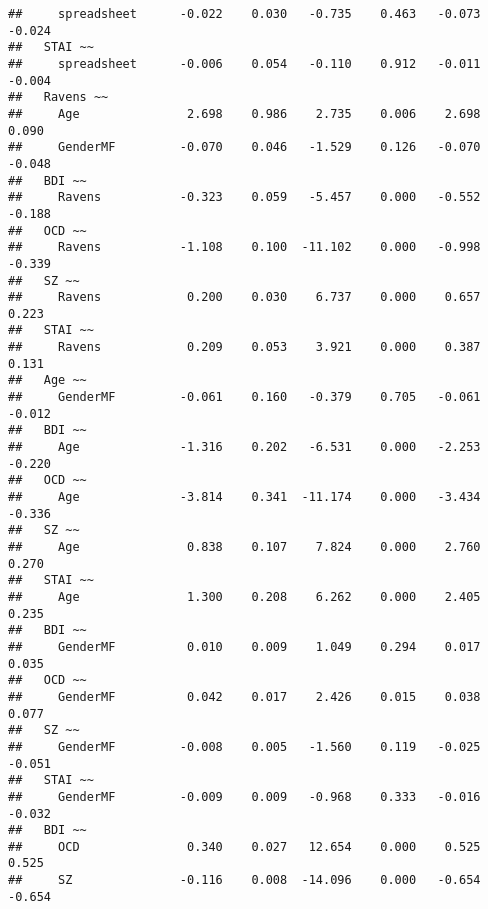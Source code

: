 \documentclass[]{article}
\begin{document}
\begin{verbatim}
##     spreadsheet      -0.022    0.030   -0.735    0.463   -0.073   -0.024
##   STAI ~~                                                               
##     spreadsheet      -0.006    0.054   -0.110    0.912   -0.011   -0.004
##   Ravens ~~                                                             
##     Age               2.698    0.986    2.735    0.006    2.698    0.090
##     GenderMF         -0.070    0.046   -1.529    0.126   -0.070   -0.048
##   BDI ~~                                                                
##     Ravens           -0.323    0.059   -5.457    0.000   -0.552   -0.188
##   OCD ~~                                                                
##     Ravens           -1.108    0.100  -11.102    0.000   -0.998   -0.339
##   SZ ~~                                                                 
##     Ravens            0.200    0.030    6.737    0.000    0.657    0.223
##   STAI ~~                                                               
##     Ravens            0.209    0.053    3.921    0.000    0.387    0.131
##   Age ~~                                                                
##     GenderMF         -0.061    0.160   -0.379    0.705   -0.061   -0.012
##   BDI ~~                                                                
##     Age              -1.316    0.202   -6.531    0.000   -2.253   -0.220
##   OCD ~~                                                                
##     Age              -3.814    0.341  -11.174    0.000   -3.434   -0.336
##   SZ ~~                                                                 
##     Age               0.838    0.107    7.824    0.000    2.760    0.270
##   STAI ~~                                                               
##     Age               1.300    0.208    6.262    0.000    2.405    0.235
##   BDI ~~                                                                
##     GenderMF          0.010    0.009    1.049    0.294    0.017    0.035
##   OCD ~~                                                                
##     GenderMF          0.042    0.017    2.426    0.015    0.038    0.077
##   SZ ~~                                                                 
##     GenderMF         -0.008    0.005   -1.560    0.119   -0.025   -0.051
##   STAI ~~                                                               
##     GenderMF         -0.009    0.009   -0.968    0.333   -0.016   -0.032
##   BDI ~~                                                                
##     OCD               0.340    0.027   12.654    0.000    0.525    0.525
##     SZ               -0.116    0.008  -14.096    0.000   -0.654   -0.654

\end{verbatim}
\end{document}
